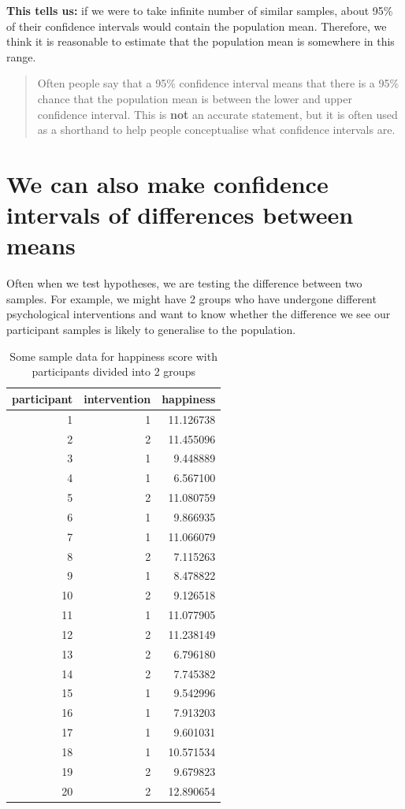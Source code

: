 \documentclass[
]{book}
\begin{document}
\textbf{This tells us:} if we were to take infinite number of similar samples, about 95\% of their confidence intervals would contain the population mean. Therefore, we think it is reasonable to estimate that the population mean is somewhere in this range.

\begin{quote}
Often people say that a 95\% confidence interval means that there is a 95\% chance that the population mean is between the lower and upper confidence interval. This is \textbf{not} an accurate statement, but it is often used as a shorthand to help people conceptualise what confidence intervals are.
\end{quote}

\hypertarget{we-can-also-make-confidence-intervals-of-differences-between-means}{%
\section{We can also make confidence intervals of differences between means}\label{we-can-also-make-confidence-intervals-of-differences-between-means}}

Often when we test hypotheses, we are testing the difference between two samples. For example, we might have 2 groups who have undergone different psychological interventions and want to know whether the difference we see our participant samples is likely to generalise to the population.

\begin{table}

\caption{\label{tab:unnamed-chunk-9}Some sample data for happiness score with participants divided into 2 groups}
\centering
\begin{tabular}[t]{r|r|r}
\hline
participant & intervention & happiness\\
\hline
1 & 1 & 11.126738\\
\hline
2 & 2 & 11.455096\\
\hline
3 & 1 & 9.448889\\
\hline
4 & 1 & 6.567100\\
\hline
5 & 2 & 11.080759\\
\hline
6 & 1 & 9.866935\\
\hline
7 & 1 & 11.066079\\
\hline
8 & 2 & 7.115263\\
\hline
9 & 1 & 8.478822\\
\hline
10 & 2 & 9.126518\\
\hline
11 & 1 & 11.077905\\
\hline
12 & 2 & 11.238149\\
\hline
13 & 2 & 6.796180\\
\hline
14 & 2 & 7.745382\\
\hline
15 & 1 & 9.542996\\
\hline
16 & 1 & 7.913203\\
\hline
17 & 1 & 9.601031\\
\hline
18 & 1 & 10.571534\\
\hline
19 & 2 & 9.679823\\
\hline
20 & 2 & 12.890654\\
\hline
\end{tabular}
\end{table}
\end{document}
